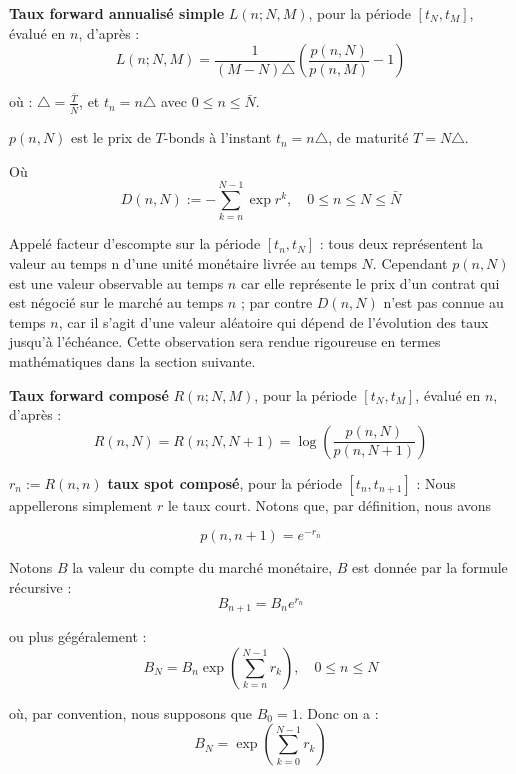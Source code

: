 \textbf{Taux forward annualisé simple} \( L(n;N,M) \), pour la période \([t_N, t_M]\), évalué en \( n \), d'après :
\begin{equation}
L(n;N,M) = \frac{1}{(M-N)\triangle} \left(\frac{p(n,N)}{p(n,M)} - 1\right)
\end{equation}

où :
    $\triangle=\frac{\bar T}{\bar N}$, et $t_n=n\triangle$ avec $0\le n \le \bar N$.
    
    $p(n,N)$ est le prix de $T$-bonds à l'instant $t_n=n\triangle$, de maturité $T=N\triangle$.
    
    Où $$D(n,N) := - \sum_{k = n}^{N-1} \exp{r^k} ,\quad 0 \le n \le N \le \bar{N}$$

Appelé facteur d'escompte sur la période $[t_n,t_N]$ : tous deux représentent la valeur au temps n d'une unité monétaire livrée au temps $N$. Cependant $p(n,N)$ est une valeur observable au temps $n$ car elle représente le prix d'un contrat qui est négocié sur le marché au temps $n$ ; par contre $D(n,N)$ n'est pas connue au temps $n$, car il s'agit d'une valeur aléatoire qui dépend de l'évolution des taux jusqu'à l'échéance. Cette observation sera rendue rigoureuse en termes mathématiques dans la section suivante.

\textbf{Taux forward composé} \( R(n;N,M) \), pour la période \([t_N, t_M]\), évalué en \( n \), d'après :
\begin{equation}
R(n,N) = R(n;N,N+1) = \log \left(\frac{p(n,N)}{p(n,N+1)}\right)
\end{equation}

$r_n := R(n,n)$ \textbf{taux spot composé}, pour la période $[t_n, t_{n+1}]$ : Nous appellerons simplement $r$ le taux court. Notons que, par définition, nous avons

\begin{equation}
p(n,n+1)= e^{-r_n}
\end{equation}

Notons $B$ la valeur du compte du marché monétaire, $B$ est donnée par la formule récursive : 
\begin{equation}
B_{n+1} = B_{n}e^{r_n}
\end{equation}

ou plus gégéralement : 
\begin{equation}
B_{N} = B_{n}\exp{\left(\sum_{k = n}^{N-1}r_k\right)}, \quad 0 \le n \le N
\end{equation}

où, par convention, nous supposons que $B_0 = 1$. Donc on a : 
\begin{equation}
B_{N} = \exp{\left(\sum_{k = 0}^{N-1}r_k\right)}
\end{equation}
